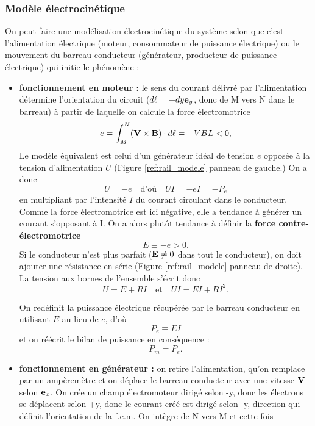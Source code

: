 \documentclass[11pt,a4paper]{report}
\begin{document}
\subsubsection*{Modèle électrocinétique}

On peut faire une modélisation électrocinétique du système selon que c'est l'alimentation électrique (moteur, consommateur de puissance électrique) ou le mouvement du barreau conducteur (générateur, producteur de puissance électrique) qui initie le phénomène :\\
\begin{itemize}
	\item \textbf{fonctionnement en moteur :} le sens du courant délivré par l'alimentation détermine 		l'orientation du circuit ($d\ell = +dy \bold{e}_y$, donc de M vers N dans le barreau) à partir de 		laquelle on calcule la force électromotrice 
	\begin{equation}
		e = \int_M^N (\bold{V}\times\bold{B})\cdot d\ell = - VBL < 0,
	\end{equation}
	Le modèle équivalent est celui d'un générateur idéal de tension $e$ opposée à la tension 				d'alimentation $U$ (Figure \ref{ref:rail_modele} panneau de gauche.) On a donc
	\begin{equation}
		U = -e \quad\text{d'où}\quad UI = -eI = -P_e
	\end{equation}
	en multipliant par l'intensité $I$ du courant circulant dans le conducteur. Comme la force 				électromotrice est ici négative, elle a tendance à générer un courant s'opposant à I. On a alors 		plutôt tendance à définir la \textbf{force contre-électromotrice}
	\begin{equation}
		E \equiv -e > 0.
	\end{equation}	 
	Si le conducteur n'est plus parfait ($\bold{E} \neq 0$ dans tout le conducteur), on doit ajouter 		une résistance en série (Figure \ref{ref:rail_modele} panneau de droite).
	La tension aux bornes de l'ensemble s'écrit donc
	\begin{equation}
		\boxed{U = E + RI} \quad\text{et}\quad UI = EI + RI^2.
	\end{equation}
	
	On redéfinit la puissance électrique récupérée par le barreau conducteur en utilisant $E$ au lieu 		de $e$, d'où
	\begin{equation}
		\boxed{P_e \equiv EI}
	\end{equation}
	et on réécrit le bilan de puissance en conséquence :
	\begin{equation}
		\boxed{P_m = P_e}.
	\end{equation}
	
	\item \textbf{fonctionnement en générateur :} on retire l'alimentation, qu'on remplace par un 			ampèremètre et on déplace le barreau conducteur avec une vitesse $\bold{V}$ selon $\bold{e}_x$. On 		crée un champ électromoteur dirigé selon -y, donc les électrons se déplacent selon +y, donc le 			courant créé est dirigé selon -y, direction qui définit l'orientation de la f.e.m. On intègre de N 		vers M et cette fois
\end{itemize}
\end{document}

